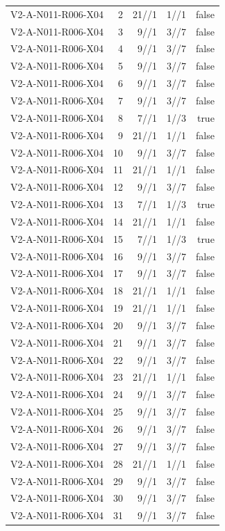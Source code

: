 {\begin{longtable}{lrrrr}
V2-A-N011-R006-X04 & 2 & 21//1 & 1//1 & false \\
V2-A-N011-R006-X04 & 3 & 9//1 & 3//7 & false \\
V2-A-N011-R006-X04 & 4 & 9//1 & 3//7 & false \\
V2-A-N011-R006-X04 & 5 & 9//1 & 3//7 & false \\
V2-A-N011-R006-X04 & 6 & 9//1 & 3//7 & false \\
V2-A-N011-R006-X04 & 7 & 9//1 & 3//7 & false \\
V2-A-N011-R006-X04 & 8 & 7//1 & 1//3 & true \\
V2-A-N011-R006-X04 & 9 & 21//1 & 1//1 & false \\
V2-A-N011-R006-X04 & 10 & 9//1 & 3//7 & false \\
V2-A-N011-R006-X04 & 11 & 21//1 & 1//1 & false \\
V2-A-N011-R006-X04 & 12 & 9//1 & 3//7 & false \\
V2-A-N011-R006-X04 & 13 & 7//1 & 1//3 & true \\
V2-A-N011-R006-X04 & 14 & 21//1 & 1//1 & false \\
V2-A-N011-R006-X04 & 15 & 7//1 & 1//3 & true \\
V2-A-N011-R006-X04 & 16 & 9//1 & 3//7 & false \\
V2-A-N011-R006-X04 & 17 & 9//1 & 3//7 & false \\
V2-A-N011-R006-X04 & 18 & 21//1 & 1//1 & false \\
V2-A-N011-R006-X04 & 19 & 21//1 & 1//1 & false \\
V2-A-N011-R006-X04 & 20 & 9//1 & 3//7 & false \\
V2-A-N011-R006-X04 & 21 & 9//1 & 3//7 & false \\
V2-A-N011-R006-X04 & 22 & 9//1 & 3//7 & false \\
V2-A-N011-R006-X04 & 23 & 21//1 & 1//1 & false \\
V2-A-N011-R006-X04 & 24 & 9//1 & 3//7 & false \\
V2-A-N011-R006-X04 & 25 & 9//1 & 3//7 & false \\
V2-A-N011-R006-X04 & 26 & 9//1 & 3//7 & false \\
V2-A-N011-R006-X04 & 27 & 9//1 & 3//7 & false \\
V2-A-N011-R006-X04 & 28 & 21//1 & 1//1 & false \\
V2-A-N011-R006-X04 & 29 & 9//1 & 3//7 & false \\
V2-A-N011-R006-X04 & 30 & 9//1 & 3//7 & false \\
V2-A-N011-R006-X04 & 31 & 9//1 & 3//7 & false \\

\end{longtable}}
